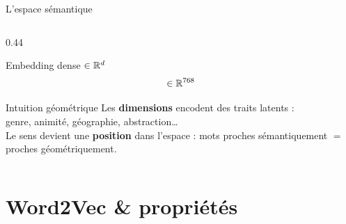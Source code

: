 \documentclass[aspectratio=169, 10pt]{beamer}
\begin{document}
\begin{frame}{L'espace sémantique}
\begin{columns}[T]
\begin{column}{0.44\textwidth}
\begin{block}{Embedding dense $\in \mathbb{R}^d$}
\[          \in \mathbb{R}^{768}
        \]
      \end{block}
      \vspace{2pt}
      \begin{exampleblock}{Intuition géométrique}
        Les \textbf{dimensions} encodent des traits latents :\\
        genre, animité, géographie, abstraction\ldots\\[3pt]
        Le sens devient une \textbf{position} dans l'espace :
        mots proches sémantiquement $=$ proches géométriquement.
      \end{exampleblock}
    \end{column}
  \end{columns}
\end{frame}

\section{Word2Vec \& propriétés}
\end{document}
